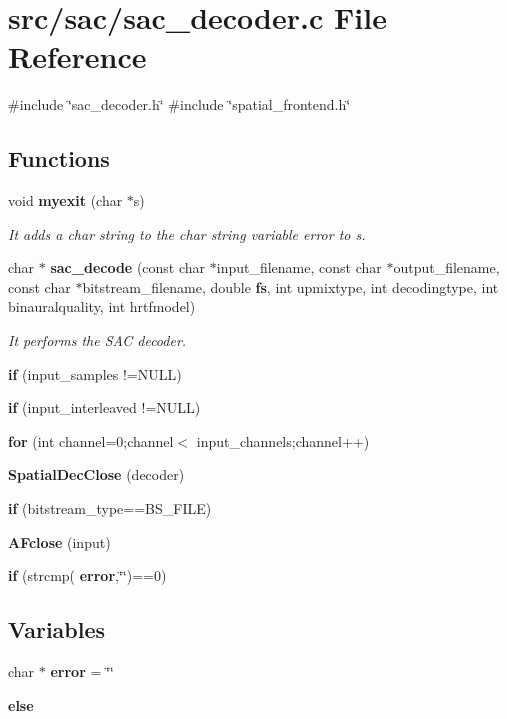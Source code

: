 \section{src/sac/sac\+\_\+decoder.c File Reference}
\label{sac__decoder_8c}
{\ttfamily \#include \char`\"{}sac\+\_\+decoder.\+h\char`\"{}}\newline
{\ttfamily \#include \char`\"{}spatial\+\_\+frontend.\+h\char`\"{}}\newline
\subsection*{Functions}
\begin{DoxyCompactItemize}
\item 
void \textbf{ myexit} (char $\ast$s)
\begin{DoxyCompactList}\small\item\em It adds a char string to the char string variable error to s. \end{DoxyCompactList}\item 
char $\ast$ \textbf{ sac\+\_\+decode} (const char $\ast$input\+\_\+filename, const char $\ast$output\+\_\+filename, const char $\ast$bitstream\+\_\+filename, double \textbf{ fs}, int upmixtype, int decodingtype, int binauralquality, int hrtfmodel)
\begin{DoxyCompactList}\small\item\em It performs the S\+AC decoder. \end{DoxyCompactList}\item 
\textbf{ if} (input\+\_\+samples !=N\+U\+LL)
\item 
\textbf{ if} (input\+\_\+interleaved !=N\+U\+LL)
\item 
\textbf{ for} (int channel=0;channel$<$ input\+\_\+channels;channel++)
\item 
\textbf{ Spatial\+Dec\+Close} (decoder)
\item 
\textbf{ if} (bitstream\+\_\+type==B\+S\+\_\+\+F\+I\+LE)
\item 
\textbf{ A\+Fclose} (input)
\item 
\textbf{ if} (strcmp(\textbf{ error},\char`\"{}\char`\"{})==0)
\end{DoxyCompactItemize}
\subsection*{Variables}
\begin{DoxyCompactItemize}
\item 
char $\ast$ \textbf{ error} = \char`\"{}\char`\"{}
\item 
\textbf{ else}
\end{DoxyCompactItemize}


